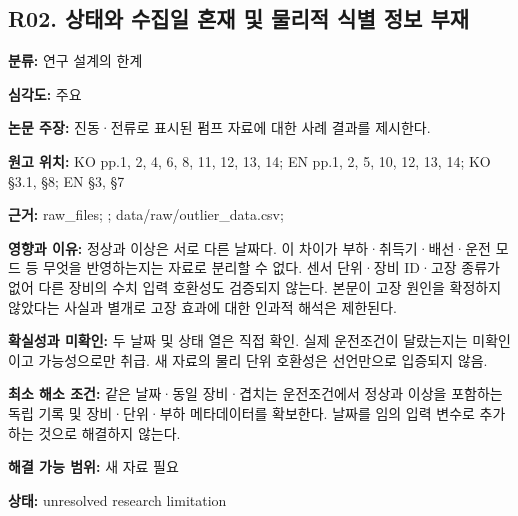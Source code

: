 \documentclass[11pt,a4paper]{article}
\begin{document}
\subsection*{R02. 상태와 수집일 혼재 및 물리적 식별 정보 부재}
\textbf{분류:} 연구 설계의 한계
\par
\textbf{심각도:} 주요
\par
\textbf{논문 주장:} 진동·전류로 표시된 펌프 자료에 대한 사례 결과를 제시한다.
\par
\textbf{원고 위치:} KO pp.1, 2, 4, 6, 8, 11, 12, 13, 14; EN pp.1, 2, 5, 10, 12, 13, 14; KO §3.1, §8; EN §3, §7
\par
\textbf{근거:}  raw\_files; ; data/raw/outlier\_data.csv; 
\par
\textbf{영향과 이유:} 정상과 이상은 서로 다른 날짜다. 이 차이가 부하·취득기·배선·운전 모드 등 무엇을 반영하는지는 자료로 분리할 수 없다. 센서 단위·장비 ID·고장 종류가 없어 다른 장비의 수치 입력 호환성도 검증되지 않는다. 본문이 고장 원인을 확정하지 않았다는 사실과 별개로 고장 효과에 대한 인과적 해석은 제한된다.
\par
\textbf{확실성과 미확인:} 두 날짜 및 상태 열은 직접 확인. 실제 운전조건이 달랐는지는 미확인이고 가능성으로만 취급. 새 자료의 물리 단위 호환성은 선언만으로 입증되지 않음.
\par
\textbf{최소 해소 조건:} 같은 날짜·동일 장비·겹치는 운전조건에서 정상과 이상을 포함하는 독립 기록 및 장비·단위·부하 메타데이터를 확보한다. 날짜를 임의 입력 변수로 추가하는 것으로 해결하지 않는다.
\par
\textbf{해결 가능 범위:} 새 자료 필요
\par
\textbf{상태:} unresolved research limitation
\par
\end{document}
